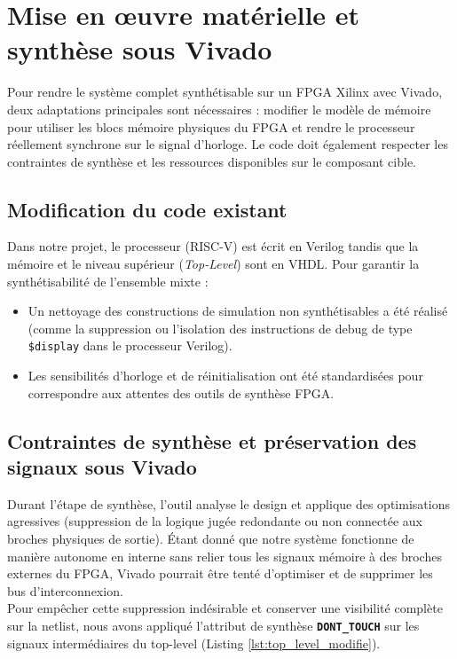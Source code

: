 \section{Mise en œuvre matérielle et synthèse sous Vivado}

Pour rendre le système complet synthétisable sur un FPGA Xilinx avec Vivado, deux adaptations principales sont nécessaires : modifier le modèle de mémoire pour utiliser les blocs mémoire physiques du FPGA et rendre le processeur réellement synchrone sur le signal d'horloge. Le code doit également respecter les contraintes de synthèse et les ressources disponibles sur le composant cible.
\\

\subsection{Modification du code existant}

Dans notre projet, le processeur (RISC-V) est écrit en Verilog tandis que la mémoire et le niveau supérieur (\textit{Top-Level}) sont en VHDL. Pour garantir la synthétisabilité de l'ensemble mixte :
\begin{itemize}
    \item Un nettoyage des constructions de simulation non synthétisables a été réalisé (comme la suppression ou l'isolation des instructions de debug de type \texttt{\$display} dans le processeur Verilog).
    \item Les sensibilités d'horloge et de réinitialisation ont été standardisées pour correspondre aux attentes des outils de synthèse FPGA.
\end{itemize}

\subsection{Contraintes de synthèse et préservation des signaux sous Vivado}

Durant l'étape de synthèse, l'outil analyse le design et applique des optimisations agressives (suppression de la logique jugée redondante ou non connectée aux broches physiques de sortie). Étant donné que notre système fonctionne de manière autonome en interne sans relier tous les signaux mémoire à des broches externes du FPGA, Vivado pourrait être tenté d'optimiser et de supprimer les bus d'interconnexion.
\\

Pour empêcher cette suppression indésirable et conserver une visibilité complète sur la netlist, nous avons appliqué l'attribut de synthèse \textbf{\texttt{DONT\_TOUCH}} sur les signaux intermédiaires du top-level (Listing \ref{lst:top_level_modifie}).
\\

